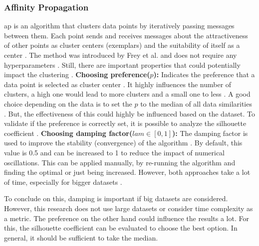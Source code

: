 \subsubsection{Affinity Propagation} \label{theory:clustering-ap}
\gls{ap} is an algorithm that clusters data points by iteratively passing messages between them.
Each point sends and receives messages about the attractiveness of other points as cluster centers (exemplars) and the suitability of itself as a center \citep{keller_balancing_2021}.
The method was introduced by Frey et al. and does not require any hyperparameters \citep{frey_clustering_2007}.
Still, there are important properties that could potentially impact the clustering \citep{wang_adaptive_2007}. \newline
\textbf{Choosing preference($p$): }
Indicates the preference that a data point is selected as cluster center \citep{wang_adaptive_2007}.
It highly influences the number of clusters, a high one would lead to more clusters and a small one to less \citep{moiane_evaluation_2018}.
A good choice depending on the data is to set the $p$ to the median of all data similarities \citep{wang_adaptive_2007}.
But, the effectiveness of this could highly be influenced based on the dataset.
To validate if the preference is correctly set, it is possible to analyze the silhouette coefficient \citep{moiane_evaluation_2018}.
\newline
\textbf{Choosing damping factor($lam \in [0,1] $):}
The damping factor is used to improve the stability (convergence) of the algorithm \citep{wang_adaptive_2007}.
By default, this value is 0.5 and can be increased to 1 to reduce the impact of numerical oscillations.
This can be applied manually, by re-running the algorithm and finding the optimal or just being increased.
However, both approaches take a lot of time, especially for bigger datasets \citep{wang_adaptive_2007}. \newline

To conclude on this, damping is important if big datasets are considered.
However, this research does not use large datasets or consider time complexity as a metric.
The preference on the other hand could influence the results a lot.
For this, the silhouette coefficient can be evaluated to choose the best option.
In general, it should be sufficient to take the median.
